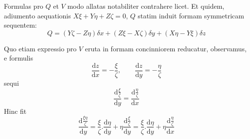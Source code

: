 Formulas pro $Q$ et $V$ modo allatas notabiliter contrahere licet. Et quidem, adiumento aequationis $X\xi+Y\eta+Z\zeta=0$, $Q$ statim induit formam symmetricam sequentem:
\[
Q=(Y\zeta-Z\eta)\delta x+(Z\xi-X\zeta)\delta y+(X\eta-Y\xi)\delta z
\]

Quo etiam expressio pro $V$ eruta in formam concinniorem reducatur, observamus, e formulis
\[
\frac{\mathrm{d}z}{\mathrm{d}x}=-\frac{\xi}{\zeta},\qquad \frac{\mathrm{d}z}{\mathrm{d}y}=-\frac{\eta}{\zeta}
\]
sequi
\[
\frac{\mathrm{d}\frac{\xi}{\zeta}}{\mathrm{d}y}=\frac{\mathrm{d}\frac{\eta}{\zeta}}{\mathrm{d}x}
\]
Hinc fit
\[
\frac{\mathrm{d}\frac{\xi\eta}{\zeta}}{\mathrm{d}y}=\frac{\xi}{\zeta}.\frac{\mathrm{d}\eta}{\mathrm{d}y}+\eta\frac{\mathrm{d}\frac{\xi}{\zeta}}{\mathrm{d}y}=\frac{\xi}{\zeta}.\frac{\mathrm{d}\eta}{\mathrm{d}y}+\eta\frac{\mathrm{d}\frac{\eta}{\zeta}}{\mathrm{d}x}
\]
